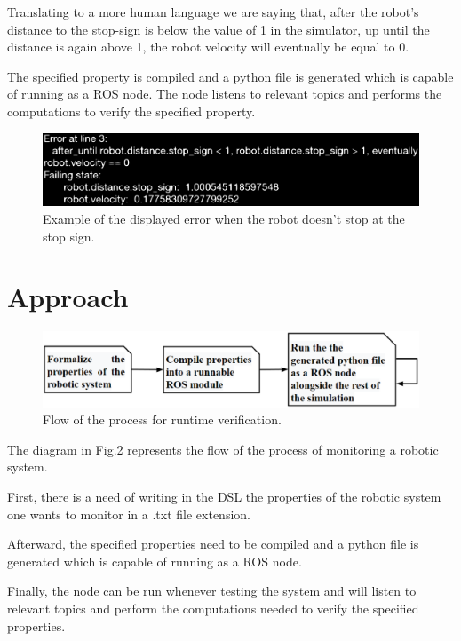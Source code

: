 \documentclass[runningheads]{llncs}
\begin{document}
\vspace{3mm}

Translating to a more human language we are saying that, after the robot's distance to the stop-sign is below the value of 1 in the simulator, up until the distance is again above 1, the robot velocity will eventually be equal to 0.

The specified property is compiled and a python file is generated which is capable of running as a ROS node. The node listens to relevant topics and performs the computations to verify the specified property.

\begin{figure}
\includegraphics[width=\textwidth]{error.eps}
\caption{Example of the displayed error when the robot doesn't stop at the stop sign.} \label{fig1}
\end{figure}

\section{Approach}

\begin{figure}
\includegraphics[width=\textwidth]{diagram.eps}
\caption{Flow of the process for runtime verification.} \label{fig2}
\end{figure}

The diagram in Fig.2 represents the flow of the process of monitoring a robotic system. 

First, there is a need of writing in the DSL the properties of the robotic system one wants to monitor in a .txt file extension.

Afterward, the specified properties need to be compiled and a python file is generated which is capable of running as a ROS node.

Finally, the node can be run whenever testing the system and will listen to relevant topics and perform the computations needed to verify the specified properties.
\end{document}
